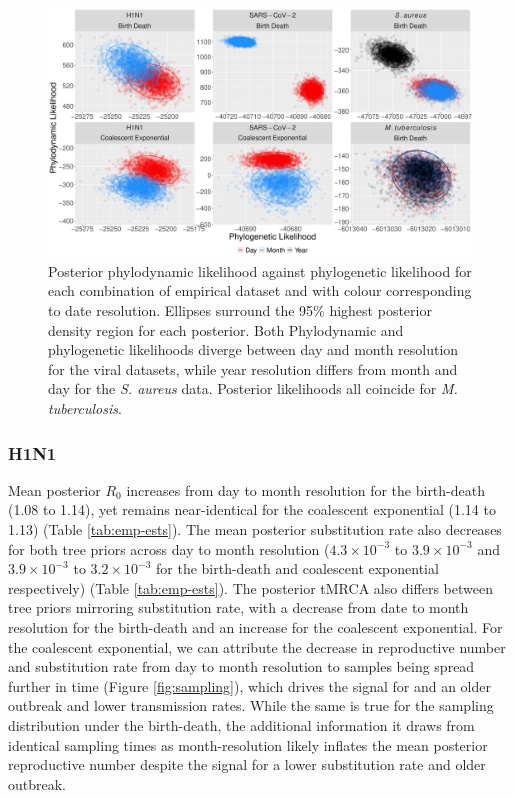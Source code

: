 \documentclass[12pt]{article}
\begin{document}
\begin{spacing}{2}
\begin{figure}[H]
    \centering
    \includegraphics[width=\textwidth]{figures/empirical_likelihood.pdf}
    \caption{Posterior phylodynamic likelihood against phylogenetic likelihood for each combination of empirical dataset and with colour corresponding to date resolution. Ellipses surround the 95\% highest posterior density region for each posterior. Both Phylodynamic and phylogenetic likelihoods diverge between day and month resolution for the viral datasets, while year resolution differs from month and day for the \textit{S. aureus} data. Posterior likelihoods all coincide for \textit{M. tuberculosis}. }
    \label{fig:emp-likelihood}
\end{figure}

\subsubsection*{H1N1}
Mean posterior $R_0$ increases from day to month resolution for the birth-death (1.08 to 1.14), yet remains near-identical for the coalescent exponential (1.14 to 1.13) (Table \ref{tab:emp-ests}). The mean posterior substitution rate also decreases for both tree priors across day to month resolution ($4.3\times10^{-3}$ to $3.9\times10^{-3}$ and $3.9\times10^{-3}$ to $3.2\times10^{-3}$ for the birth-death and coalescent exponential respectively) (Table \ref{tab:emp-ests}). The posterior tMRCA also differs between tree priors mirroring substitution rate, with a decrease from date to month resolution for the birth-death and an increase for the coalescent exponential. For the coalescent exponential, we can attribute the decrease in reproductive number and substitution rate from day to month resolution to samples being spread further in time (Figure \ref{fig:sampling}), which drives the signal for and an older outbreak and lower transmission rates. While the same is true for the sampling distribution under the birth-death, the additional information it draws from identical sampling times as month-resolution likely inflates the mean posterior reproductive number despite the signal for a lower substitution rate and older outbreak.


\end{spacing}
\end{document}
